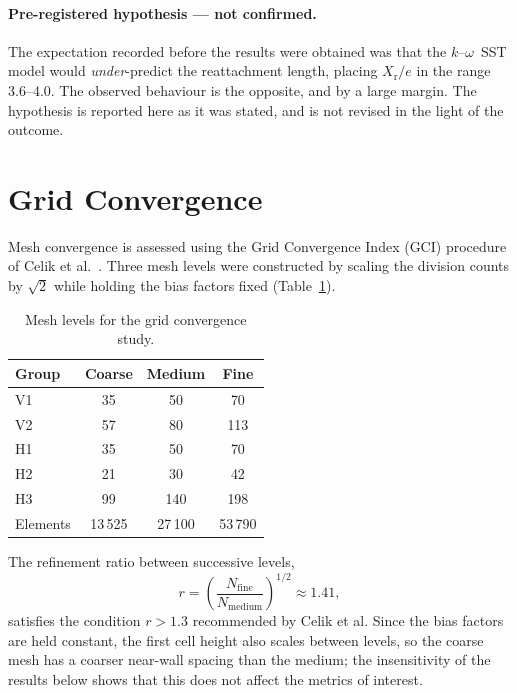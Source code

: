 \documentclass[11pt,a4paper]{article}
\newcommand{\Xr}{X_{\mathrm{r}}}
\begin{document}
\paragraph{Pre-registered hypothesis --- not confirmed.}
The expectation recorded before the results were obtained was that the
$k$--$\omega$~SST model would \emph{under}-predict the reattachment length,
placing $\Xr/e$ in the range $3.6$--$4.0$. The observed behaviour is the
opposite, and by a large margin. The hypothesis is reported here as it was
stated, and is not revised in the light of the outcome.

\section{Grid Convergence}
\label{sec:gci}

Mesh convergence is assessed using the Grid Convergence Index (GCI)
procedure of Celik et al.~\cite{celik2008}. Three mesh levels were
constructed by scaling the division counts by $\sqrt{2}$ while holding the
bias factors fixed (Table~\ref{tab:gci}).

\begin{table}[htbp]
\centering
\caption{Mesh levels for the grid convergence study.}
\label{tab:gci}
\begin{tabular}{lccc}
\toprule
Group & Coarse & Medium & Fine \\
\midrule
V1 & 35 & 50  & 70  \\
V2 & 57 & 80  & 113 \\
H1 & 35 & 50  & 70  \\
H2 & 21 & 30  & 42  \\
H3 & 99 & 140 & 198 \\
\midrule
Elements & 13\,525 & 27\,100 & 53\,790 \\
\bottomrule
\end{tabular}
\end{table}

The refinement ratio between successive levels,
\begin{equation}
  r = \left(\frac{N_{\text{fine}}}{N_{\text{medium}}}\right)^{1/2}
    \approx 1.41,
\end{equation}
satisfies the condition $r > 1.3$ recommended by Celik et al. Since the bias
factors are held constant, the first cell height also scales between levels,
so the coarse mesh has a coarser near-wall spacing than the medium; the
insensitivity of the results below shows that this does not affect the
metrics of interest.
\end{document}
